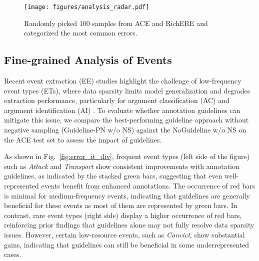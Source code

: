 \begin{figure}
    \centering
    \texttt{[image: figures/analysis\_radar.pdf]}
    \caption{Randomly picked 100 samples from ACE and RichERE and categorized the most common errors.}
    \label{fig:error_cat}
    \vspace{-1em}
\end{figure}


\subsection{Fine-grained Analysis of Events}
Recent event extraction (EE) studies highlight the challenge of low-frequency event types (ETs), where data sparsity limits model generalization and degrades extraction performance, particularly for argument classification (AC) and argument identification (AI) \cite{Exploring the Feasibility of ChatGPT for Event Extraction}. To evaluate whether annotation guidelines can mitigate this issue, we compare the best-performing guideline approach without negative sampling (Guideline-PN w/o NS) against the NoGuideline w/o NS on the ACE test set to assess the impact of guidelines.

As shown in Fig.~\ref{fig:error_it_div}, frequent event types (left side of the figure) such as \textit{Attack} and \textit{Transport} show consistent improvements with annotation guidelines, as indicated by the stacked green bars, suggesting that even well-represented events benefit from enhanced annotations. The occurrence of red bars is minimal for medium-frequency events, indicating that guidelines are generally beneficial for these events as most of them are represented by green bars. In contrast, rare event types (right side) display a higher occurrence of red bars, reinforcing prior findings that guidelines alone may not fully resolve data sparsity issues. However, certain low-resource events, such as \textit{Convict}, show substantial gains, indicating that guidelines can still be beneficial in some underrepresented cases.

